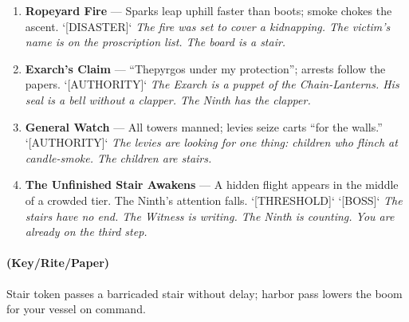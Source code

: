 \begin{enumerate}
\item[J] \textbf{Ropeyard Fire} --- Sparks leap uphill faster than boots; smoke chokes the ascent. `[DISASTER]`
  \hfill \textit{The fire was set to cover a kidnapping. The victim's name is on the proscription list. The board is a stair.}
\item[Q] \textbf{Exarch's Claim} --- ``Thepyrgos under my protection''; arrests follow the papers. `[AUTHORITY]`
  \hfill \textit{The Exarch is a puppet of the Chain-Lanterns. His seal is a bell without a clapper. The Ninth has the clapper.}
\item[K] \textbf{General Watch} --- All towers manned; levies seize carts ``for the walls.'' `[AUTHORITY]`
  \hfill \textit{The levies are looking for one thing: children who flinch at candle-smoke. The children are stairs.}
\item[A] \textbf{The Unfinished Stair Awakens} --- A hidden flight appears in the middle of a crowded tier. The Ninth's attention falls. `[THRESHOLD]` `[BOSS]`
  \hfill \textit{The stairs have no end. The Witness is writing. The Ninth is counting. You are already on the third step.}
\end{enumerate}

\paragraph*{(Key/Rite/Paper)} Stair token passes a barricaded stair without delay; harbor pass lowers the boom for your vessel on command.

